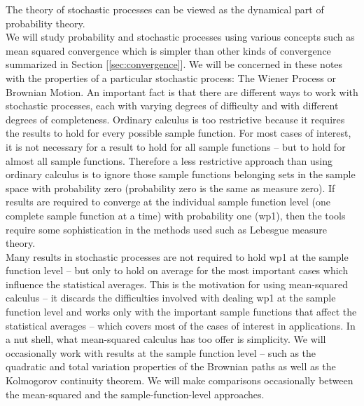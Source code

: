 The theory of stochastic processes can be viewed as the dynamical part of probability theory.\\ 

We will study probability and stochastic processes using various concepts such as {\elevenit mean squared  convergence}\/ which is simpler than other kinds of convergence summarized in Section [\ref{sec:convergence}].  We will be concerned in these notes with the properties of a particular stochastic process: The Wiener Process or Brownian Motion. An important fact is that there are different ways to work with stochastic processes, each with varying degrees of difficulty and with different degrees of completeness. {\elevenit Ordinary}\/ calculus is too restrictive because it requires the results to hold for {\elevenit every} possible sample function. For most cases of interest, it is not necessary for a result to hold for all sample functions -- but to hold for {\elevenit almost all}\/ sample functions. Therefore a less restrictive approach than using ordinary calculus is to ignore those sample functions belonging sets in the sample space with probability zero (probability zero is the same as measure zero). If results are required to converge at the individual sample function level (one complete sample function at a time) with probability one (wp1), then the tools require some sophistication in the methods used such as Lebesgue measure theory. \\ 

Many results in stochastic processes  are not required to hold wp1 at the sample function level -- but only to hold {\elevenit on average}\/ for the most important cases which influence the statistical averages. This is the motivation for using {\elevenit mean-squared calculus}\/ --  it discards the difficulties involved with dealing wp1 at the sample function level and works only with the {\elevenit important}\/ sample functions that affect the statistical averages -- which covers most of the cases of interest in applications. In a nut shell, what mean-squared calculus has too offer is {\elevenit simplicity}. We will occasionally work with results at the sample function level -- such as the quadratic and total variation properties of the Brownian paths as well as the Kolmogorov continuity theorem. We will make comparisons occasionally between the mean-squared and the sample-function-level approaches.